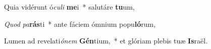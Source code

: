 \item Quia vidérunt ó\textit{cu}\textit{li} \textbf{me}i~* salutáre \textbf{tu}um,
\item \textit{Quod} \textit{pa}\textbf{rás}ti~* ante fáciem ómnium popu\textbf{ló}rum,
\item Lumen ad revelati\textit{ó}\textit{nem} \textbf{Gén}tium,~* et glóriam plebis tuæ \textbf{Is}raël.
